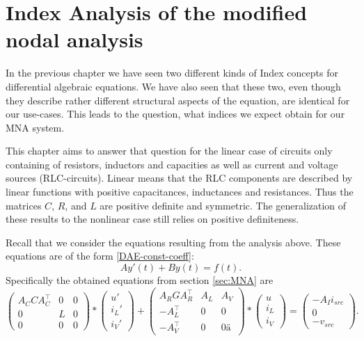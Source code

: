 \chapter{Index Analysis of the modified nodal analysis}

\cite{ModellingAndDiscretizationOfCircuitProblems}

In the previous chapter we have seen two different kinds of Index concepts for differential algebraic equations. We have also seen that these two, even though they describe rather different structural aspects of the equation, are identical for our use-cases. This leads to the question, what indices we expect obtain for our MNA system.

This chapter aims to answer that question for the linear case of circuits only containing of resistors, inductors and capacities as well as current and voltage sources (RLC-circuits). Linear means that the RLC components are described by linear functions with positive capacitances, inductances and resistances. Thus the matrices $C$, $R$, and $L$ are positive definite and symmetric. The generalization of these results to the nonlinear case still relies on positive definiteness.

Recall that we consider the equations resulting from the analysis above. These equations are of the form \eqref{DAE-const-coeff}:
\begin{displaymath}
	A y'(t) + B y(t) = f(t).
\end{displaymath}
Specifically the obtained equations from section \ref{sec:MNA} are
\begin{displaymath}
	\begin{pmatrix}
		A_C C A_C^\top & 0 & 0 \\
		0 & L & 0 \\
		0 & 0 & 0
	\end{pmatrix}
	*
	\begin{pmatrix}
		u' \\
		i_L' \\
		i_V'
	\end{pmatrix}
	+
	\begin{pmatrix}
		A_R G A_R^\top & A_L & A_V \\
		-A_L^\top & 0 & 0 \\
		-A_V^\top & 0 & 0 ä
	\end{pmatrix}
	*
	\begin{pmatrix}
		u \\
		i_L \\
		i_V
	\end{pmatrix}
	=
	\begin{pmatrix}
		-A_I i_{src} \\
		0 \\
		-v_{src}
	\end{pmatrix}.
\end{displaymath}

